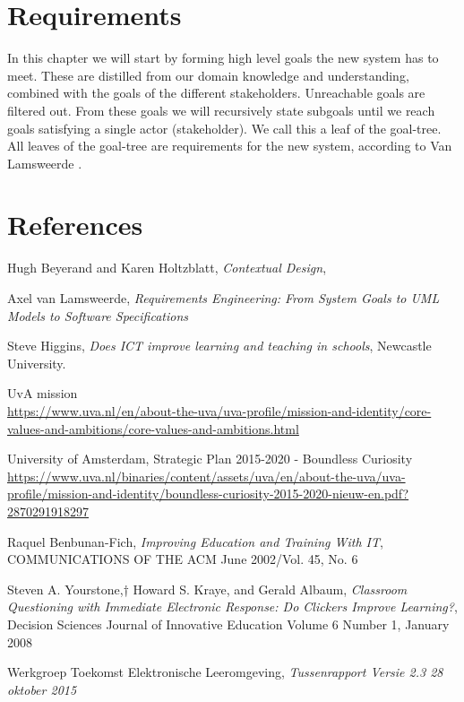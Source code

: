 \chapter{Requirements}
In this chapter we will start by forming high level goals the new system has to meet. These are distilled from our domain knowledge and understanding, combined with the goals of the different stakeholders. Unreachable goals are filtered out. From these goals we will recursively state subgoals until we reach goals satisfying a single actor (stakeholder). We call this a leaf of the goal-tree. All leaves of the goal-tree are requirements for the new system, according to Van Lamsweerde \cite{RE_book}.


\chapter{References}

\begin{thebibliography}{9}
	
	Hugh Beyerand and Karen Holtzblatt,
	\emph{Contextual Design},
	
	Axel van Lamsweerde,
	\emph{Requirements Engineering: From System Goals to UML Models to Software Specifications}
	
	Steve Higgins,
	\emph{Does ICT improve learning and teaching in schools},
	Newcastle University.
	
	UvA mission \\
	\url{https://www.uva.nl/en/about-the-uva/uva-profile/mission-and-identity/core-values-and-ambitions/core-values-and-ambitions.html}
	
	University of Amsterdam,
	Strategic Plan 2015-2020 - Boundless Curiosity \\
	\url{https://www.uva.nl/binaries/content/assets/uva/en/about-the-uva/uva-profile/mission-and-identity/boundless-curiosity-2015-2020-nieuw-en.pdf?2870291918297}
	
	Raquel Benbunan-Fich,
	\emph{Improving Education and Training With IT},
	COMMUNICATIONS OF THE ACM June 2002/Vol. 45, No. 6
	
	Steven A. Yourstone,† Howard S. Kraye, and Gerald Albaum,
	\emph{Classroom Questioning with Immediate Electronic Response: Do Clickers Improve Learning?},
	Decision Sciences Journal of Innovative Education Volume 6 Number 1,
	January 2008
	
	Werkgroep Toekomst Elektronische Leeromgeving,
	\emph{Tussenrapport Versie 2.3 28 oktober 2015}
	

	
\end{thebibliography}


\appendix




